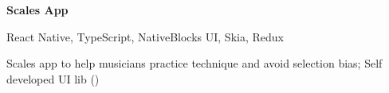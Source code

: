 \vspace{0.10 cm}
\begin{twocolentry_proj}{
    \mbox{}%
}
\fontsize{11 pt}{11 pt}\textbf{Scales App}
\end{twocolentry_proj}
\begin{onecolentry}
    React Native, TypeScript, NativeBlocks UI, Skia, Redux
    \begin{highlights}
        \item Scales app to help musicians practice technique and avoid selection bias; Self developed UI lib ()
    \end{highlights}
\end{onecolentry}

